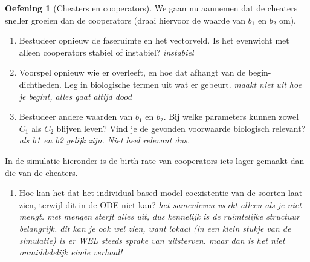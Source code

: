 \documentclass[
  a4paper,
]{scrbook}
\providecommand{\tightlist}{%
  \setlength{\itemsep}{0pt}\setlength{\parskip}{0pt}}\usepackage{longtable,booktabs,array}
\theoremstyle{definition}
\newtheorem{exercise}{Oefening}[chapter]
\theoremstyle{remark}
\begin{document}
\begin{exercise}[Cheaters en
cooperators]
We gaan nu aannemen dat de cheaters sneller groeien dan de cooperators
(draai hiervoor de waarde van \(b_1\) en \(b_2\) om).

\begin{enumerate}
\def\labelenumi{\alph{enumi}.}
\setcounter{enumi}{6}
\tightlist
\item
  Bestudeer opnieuw de faseruimte en het vectorveld. Is het evenwicht
  met alleen cooperators stabiel of instabiel? \emph{instabiel}
\item
  Voorspel opnieuw wie er overleeft, en hoe dat afhangt van de
  begin-dichtheden. Leg in biologische termen uit wat er gebeurt.
  \emph{maakt niet uit hoe je begint, alles gaat altijd dood}
\item
  Bestudeer andere waarden van \(b_1\) en \(b_2\). Bij welke parameters
  kunnen zowel \(C_1\) als \(C_2\) blijven leven? Vind je de gevonden
  voorwaarde biologisch relevant? \emph{als b1 en b2 gelijk zijn. Niet
  heel relevant dus.}
\end{enumerate}

In de simulatie hieronder is de birth rate van cooperators iets lager
gemaakt dan die van de cheaters.

\begin{enumerate}
\def\labelenumi{\alph{enumi}.}
\setcounter{enumi}{9}
\tightlist
\item
  Hoe kan het dat het individual-based model coexistentie van de soorten
  laat zien, terwijl dit in de ODE niet kan? \emph{het samenleven werkt
  alleen als je niet mengt. met mengen sterft alles uit, dus kennelijk
  is de ruimtelijke structuur belangrijk. dit kan je ook wel zien, want
  lokaal (in een klein stukje van de simulatie) is er WEL steeds sprake
  van uitsterven. maar dan is het niet onmiddelelijk einde verhaal!}
\end{enumerate}

\end{exercise}
\end{document}
